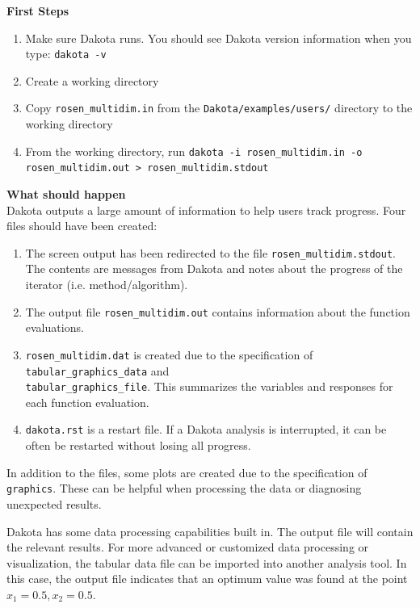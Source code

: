 {\bf First Steps}
\begin{enumerate}
  \item Make sure Dakota runs. You should see Dakota version information
   when you type: \texttt{dakota -v}
  \item Create a working directory 
  \item Copy \texttt{rosen\_multidim.in} from the \texttt{Dakota/examples/users/}
    directory to the working directory
  \item From the working directory, run \texttt{dakota -i 
    rosen\_multidim.in -o rosen\_multidim.out > rosen\_multidim.stdout}
\end{enumerate}

{\bf What should happen} \\
Dakota outputs a large amount of information to help users track  progress. 
Four files should have been created:
\begin{enumerate}
  \item The screen output has been redirected to the file 
\texttt{rosen\_multidim.stdout}. \\
  The contents are messages from Dakota and notes about the 
progress of the iterator (i.e. method/algorithm).
  \item The output file \texttt{rosen\_multidim.out} 
contains information about the function evaluations.
  \item \texttt{rosen\_multidim.dat} is created due to the 
specification of \texttt{tabular\_graphics\_data} and \\
\texttt{tabular\_graphics\_file}. This summarizes 
the variables and responses for each function evaluation.
  \item \texttt{dakota.rst} is a restart file. If a Dakota 
analysis is interrupted, it can be often be restarted without 
losing all progress.
\end{enumerate}
In addition to the files, some plots are created due to the specification 
of \texttt{graphics}. These can be helpful when processing the 
data or diagnosing unexpected results.

Dakota has some data processing capabilities built in. The output file 
will contain the relevant results. For more advanced or customized data 
processing or visualization, the tabular data file can be imported into 
another analysis tool. In this case, the output file indicates that an 
optimum value was found at the point $x_1 = 0.5, x_2 = 0.5$.

